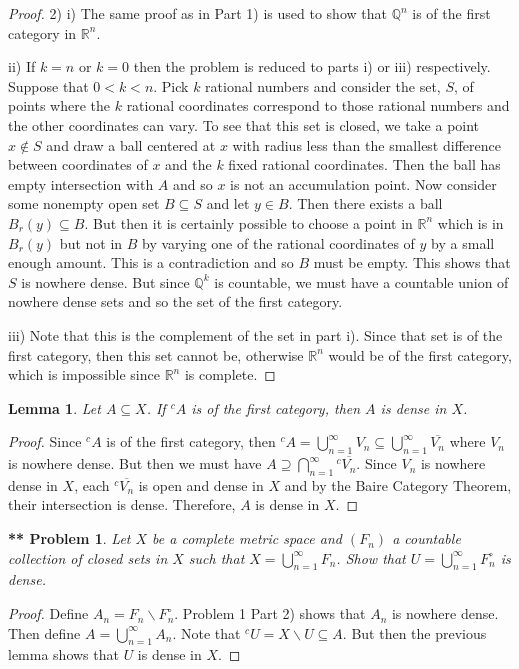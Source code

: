 \documentclass{article}
\newtheorem{**}{** Problem}
\newtheorem{lemma}{Lemma}
\begin{document}
\begin{flushleft}
\begin{proof}
2) i) The same proof as in Part 1) is used to show that $\mathbb{Q}^n$ is of the first category in $\mathbb{R}^n$.\newline

ii) If $k=n$ or $k=0$ then the problem is reduced to parts i) or iii) respectively. Suppose that $0 < k < n$. Pick $k$ rational numbers and consider the set, $S$, of points where the $k$ rational coordinates correspond to those rational numbers and the other coordinates can vary. To see that this set is closed, we take a point $x \notin S$ and draw a ball centered at $x$ with radius less than the smallest difference between coordinates of $x$ and the $k$ fixed rational coordinates. Then the ball has empty intersection with $A$ and so $x$ is not an accumulation point. Now consider some nonempty open set $B \subseteq S$ and let $y \in B$. Then there exists a ball $B_r (y) \subseteq B$. But then it is certainly possible to choose a point in $\mathbb{R}^n$ which is in $B_r (y)$ but not in $B$ by varying one of the rational coordinates of $y$ by a small enough amount. This is a contradiction and so $B$ must be empty. This shows that $S$ is nowhere dense. But since $\mathbb{Q}^k$ is countable, we must have a countable union of nowhere dense sets and so the set of the first category.\newline

iii) Note that this is the complement of the set in part i). Since that set is of the first category, then this set cannot be, otherwise $\mathbb{R}^n$ would be of the first category, which is impossible since $\mathbb{R}^n$ is complete.
\end{proof}

\begin{lemma}
Let $A \subseteq X$. If $^c A$ is of the first category, then $A$ is dense in $X$.
\end{lemma}
\begin{proof}
Since $^c A$ is of the first category, then $^c A = \bigcup_{n=1}^{\infty} V_n \subseteq \bigcup_{n=1}^{\infty} \overline{V_n}$ where $V_n$ is nowhere dense. But then we must have $A \supseteq \bigcap_{n=1}^{\infty} {^c \overline{V_n}}$. Since $V_n$ is nowhere dense in $X$, each $^c \overline{V_n}$ is open and dense in $X$ and by the Baire Category Theorem, their intersection is dense. Therefore, $A$ is dense in $X$.
\end{proof}

\begin{**}
Let $X$ be a complete metric space and $(F_n)$ a countable collection of closed sets in $X$ such that $X = \bigcup_{n=1}^{\infty} F_n$. Show that $U = \bigcup_{n=1}^{\infty} F_n^{\circ}$ is dense.
\end{**}
\begin{proof}
Define $A_n = F_n \backslash F_n^{\circ}$. Problem 1 Part 2) shows that $A_n$ is nowhere dense. Then define $A = \bigcup_{n=1}^{\infty} A_n$. Note that $^c U = X \backslash U \subseteq A$. But then the previous lemma shows that $U$ is dense in $X$.
\end{proof}


\end{flushleft}
\end{document}
